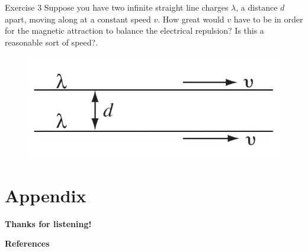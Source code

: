 \documentclass{beamer}
\begin{document}
\begin{frame}{Exercise 3}
    Suppose you have two infinite straight line charges $\lambda$, a distance $d$ apart, moving along at a constant speed $v$. How great would $v$ have to be in order for the magnetic attraction to balance the electrical repulsion? Is this a reasonable sort of speed?.
    \vspace{1em}
    \begin{figure}[htbp]
        \centering
        \includegraphics[scale=0.8]{images/e3.jpg}
        \label{Fig:}
    \end{figure}
\end{frame}

\section{Appendix}


\begin{frame}
    \begin{center}
        \LARGE\bf Thanks for listening!
    \end{center}
\end{frame}



\begin{frame}{\bf References}
	\nocite{*} %
	
	
\end{frame}
\end{document}
